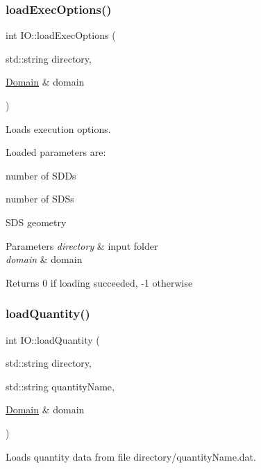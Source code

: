 \subsubsection{\texorpdfstring{load\+Exec\+Options()}{loadExecOptions()}}
{\footnotesize\ttfamily int I\+O\+::load\+Exec\+Options (\begin{DoxyParamCaption}\item[{std\+::string}]{directory,  }\item[{\mbox{\hyperlink{classDomain}{Domain}} \&}]{domain }\end{DoxyParamCaption})}



Loads execution options. 

Loaded parameters are\+:
\begin{DoxyItemize}
\item number of S\+D\+Ds
\item number of S\+D\+Ss
\item S\+DS geometry
\end{DoxyItemize}


\begin{DoxyParams}{Parameters}
{\em directory} & input folder \\
\hline
{\em domain} & domain\\
\hline
\end{DoxyParams}
\begin{DoxyReturn}{Returns}
0 if loading succeeded, -\/1 otherwise 
\end{DoxyReturn}
\mbox{\label{namespaceIO_a0b5a994855e5e391320a431095d66400}} 
\subsubsection{\texorpdfstring{load\+Quantity()}{loadQuantity()}}
{\footnotesize\ttfamily int I\+O\+::load\+Quantity (\begin{DoxyParamCaption}\item[{std\+::string}]{directory,  }\item[{std\+::string}]{quantity\+Name,  }\item[{\mbox{\hyperlink{classDomain}{Domain}} \&}]{domain }\end{DoxyParamCaption})}



Loads quantity data from file directory/quantity\+Name.\+dat. 


